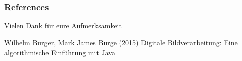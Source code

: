 \documentclass[12pt]{beamer}
\begin{document}
\section*{}


\begin{frame}
	\frametitle{References}
	\Large{Vielen Dank für eure Aufmerksamkeit}
	
	\footnotesize{
		\begin{thebibliography}{99} %
			 Wilhelm Burger, Mark James Burge (2015)
			\newblock Digitale Bildverarbeitung: Eine algorithmische Einführung mit Java
		\end{thebibliography}
	}
\end{frame}
\end{document}
